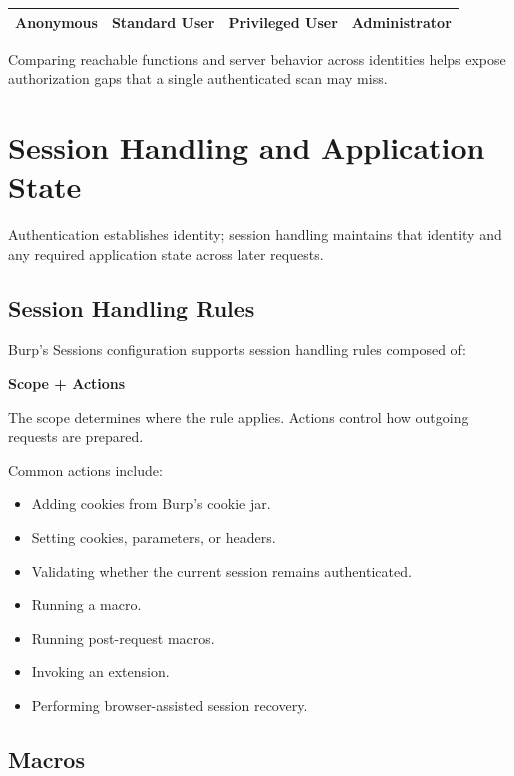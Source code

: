 \documentclass[11pt]{article}
\begin{document}
\begin{center}
\begin{tabular}{@{}llll@{}}
\toprule
Anonymous & Standard User & Privileged User & Administrator \\
\bottomrule
\end{tabular}
\end{center}

Comparing reachable functions and server behavior across identities helps expose authorization gaps that a single authenticated scan may miss.

\section{Session Handling and Application State}

Authentication establishes identity; session handling maintains that identity and any required application state across later requests.

\subsection{Session Handling Rules}

Burp's Sessions configuration supports session handling rules composed of:

\begin{center}
\textbf{Scope + Actions}
\end{center}

The scope determines where the rule applies. Actions control how outgoing requests are prepared.

Common actions include:

\begin{itemize}
  \item Adding cookies from Burp's cookie jar.
  \item Setting cookies, parameters, or headers.
  \item Validating whether the current session remains authenticated.
  \item Running a macro.
  \item Running post-request macros.
  \item Invoking an extension.
  \item Performing browser-assisted session recovery.
\end{itemize}

\subsection{Macros}
\end{document}
